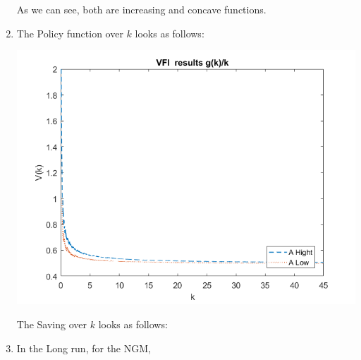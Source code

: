 \documentclass[12pt]{article}%
\begin{document}
\begin{enumerate}
	
	As we can see, both are increasing and concave functions. 
	
	\item  The Policy function over $k$ looks as follows:
	
	\begin{center}
		\includegraphics[width=1\linewidth]{g_k}
	\end{center}
	
	
	The Saving over $k$ looks as follows:

	
	\item In the Long run, for the NGM, 
	
\end{enumerate}

\strut

\onehalfspacing
\end{document}
